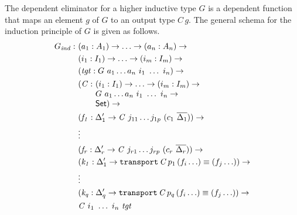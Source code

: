 \documentclass[sigplan,10pt]{acmart}
\begin{document}
The dependent eliminator for a higher inductive type $G$ is a dependent function that maps an element $g$ of $G$ to an output type $C \, g$. The general schema for the induction principle of $G$ is given as follows.
\begin{align*}
G_{\mathit{ind}} :\ & (a_1 : A_1) \to \ldots \to (a_n : A_n) \to\\
& (i_1 : I_1) \to \ldots \to (i_m : I_m) \to\\
& (\mathit{tgt} : G\ a_1 \ldots a_n\ i_1\ \ldots\ i_n) \to\\
& \begin{array}{@{}l@{}l}(\mathit{C} :\ & (i_1 : I_1) \to \ldots \to (i_m : I_m) \to\\  & G\ a_1 \ldots a_n\ i_1\ \ldots\ i_n \to\\ &\SET{})\to\end{array} \\
& (\mathit{f_1} : \Delta_1^\prime \to \mathit{C}\ j_{11} \ldots j_{1p}\ (c_1\ \overline{\Delta_1})) \to \\
& \vdots\\
& (\mathit{f_r} : \Delta_r^\prime \to \mathit{C}\ j_{r1} \ldots j_{rp}\ (c_r\ \overline{\Delta_r})) \to \\
& (\mathit{k_1} : \Delta_1^\prime \to \texttt{transport} \, \mathit{C} \, p_1 \, (f_i \ldots) \equiv (f_j \ldots)) \to \\
& \vdots\\
& (\mathit{k_q} : \Delta_q^\prime \to \texttt{transport} \, \mathit{C} \, p_q \, (f_i \ldots) \equiv (f_j \ldots)) \to \\
& \mathit{C}\ i_1\ \ldots\ i_n\ \mathit{tgt}
\end{align*}
\end{document}
